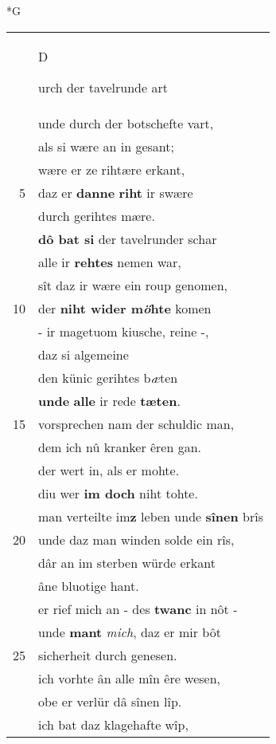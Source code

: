 \documentclass[8pt,a4paper,notitlepage]{article}
\begin{document}
\begin{table}[ht]
\begin{minipage}[t]{0.5\linewidth}
\small
\begin{center}*G
\end{center}
\begin{tabular}{rl}
 & \begin{large}D\end{large}urch der tavelrunde art\\ 
 & unde durch der botschefte vart,\\ 
 & als si wære an in gesant;\\ 
 & wære er ze rihtære erkant,\\ 
5 & daz er \textbf{danne} \textbf{riht} ir swære\\ 
 & durch gerihtes mære.\\ 
 & \textbf{dô bat si} der tavelrunder schar\\ 
 & alle ir \textbf{rehtes} nemen war,\\ 
 & sît daz ir wære ein roup genomen,\\ 
10 & der \textbf{niht wider m\textit{ö}hte} komen\\ 
 & - ir magetuom kiusche, reine -,\\ 
 & daz si algemeine\\ 
 & den künic gerihtes b\textit{æ}ten\\ 
 & \textbf{unde} \textbf{alle} ir rede \textbf{tæten}.\\ 
15 & vorsprechen nam der schuldic man,\\ 
 & dem ich nû kranker êren gan.\\ 
 & der wert in, als er mohte.\\ 
 & diu wer \textbf{im doch} niht tohte.\\ 
 & man verteilte im\textbf{z} leben unde \textbf{sînen} brîs\\ 
20 & unde daz man winden solde ein rîs,\\ 
 & dâr an im sterben würde erkant\\ 
 & âne bluotige hant.\\ 
 & er rief mich an - des \textbf{twanc} in nôt -\\ 
 & unde \textbf{mant} \textit{mich}, daz er mir bôt\\ 
25 & sicherheit durch genesen.\\ 
 & ich vorhte ân alle mîn êre wesen,\\ 
 & obe er verlür dâ sînen lîp.\\ 
 & ich bat daz klagehafte wîp,\\ 

\end{tabular}
\end{minipage}
\end{table}
\end{document}
